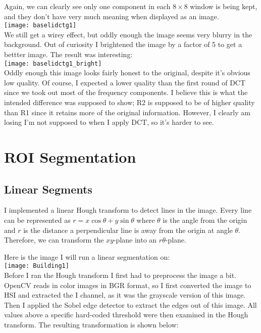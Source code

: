 \documentclass[12pt]{article}
\begin{document}
Again, we can clearly see only one component in each $8\times8$ window is being kept,
and they don't have very much meaning when displayed as an image.\\

\texttt{[image: baselidctg1]}\\

We still get a wirey effect, but oddly enough the image seems very blurry in the
background. Out of curiosity I brightened the image by a factor of 5 to get a
bettter image. The result was interesting:\\

\texttt{[image: baselidctg1\_bright]}\\

Oddly enough this image looks fairly honest to the original, despite it's
obvious low quality. Of course, I expected a lower quality than the first round
of DCT since we took out most of the frequency components. I believe this is
what the intended difference was supposed to show; R2 is supposed to be of
higher quality than R1 since it retains more of the original information.
However, I clearly am losing I'm not supposed to when I apply DCT, so it's
harder to see.

\section{ROI Segmentation}

\subsection{Linear Segments}

I implemented a linear Hough transform to detect lines in the image. Every line
can be represented as $r = x\cos{\theta} + y\sin{\theta}$ where $\theta$ is the
angle from the origin and $r$ is the distance a perpendicular line is away from
the origin at angle $\theta$. Therefore, we can transform the $xy$-plane into an
$r\theta$-plane.

Here is the image I will run a linear segmentation on:\\

\texttt{[image: Building1]}\\

Before I ran the Hough transform I first had to preprocess the image a bit.
OpenCV reads in color images in BGR format, so I first converted the image to
HSI and extracted the I channel, as it was the grayscale
version of this image. Then I applied the Sobel edge detector to extract the
edges out of this image. All values above a specific hard-coded threshold were
then examined in the Hough transform. The resulting transformation is shown
below:\\
\end{document}
